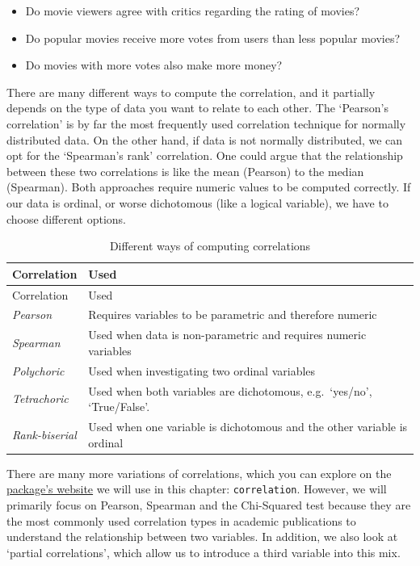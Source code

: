 \documentclass[
]{book}
\begin{document}
\begin{itemize}
\item
  Do movie viewers agree with critics regarding the rating of movies?
\item
  Do popular movies receive more votes from users than less popular movies?
\item
  Do movies with more votes also make more money?
\end{itemize}

There are many different ways to compute the correlation, and it partially depends on the type of data you want to relate to each other. The `Pearson's correlation' is by far the most frequently used correlation technique for normally distributed data. On the other hand, if data is not normally distributed, we can opt for the `Spearman's rank' correlation. One could argue that the relationship between these two correlations is like the mean (Pearson) to the median (Spearman). Both approaches require numeric values to be computed correctly. If our data is ordinal, or worse dichotomous (like a logical variable), we have to choose different options.

\begin{longtable}[]{@{}
  >{\raggedright\arraybackslash}p{}
  >{\raggedright\arraybackslash}p{}@{}}
\caption{\label{tab:different-correlations} Different ways of computing correlations}\tabularnewline
\toprule
Correlation & Used \\
\midrule
\endfirsthead
\toprule
Correlation & Used \\
\midrule
\endhead
\emph{Pearson} & Requires variables to be parametric and therefore numeric \\
\emph{Spearman} & Used when data is non-parametric and requires numeric variables \\
\emph{Polychoric} & Used when investigating two ordinal variables \\
\emph{Tetrachoric} & Used when both variables are dichotomous, e.g.~`yes/no', `True/False'. \\
\emph{Rank-biserial} & Used when one variable is dichotomous and the other variable is ordinal \\
\bottomrule
\end{longtable}

There are many more variations of correlations, which you can explore on the \href{https://easystats.github.io/correlation/articles/types.html}{package's website} we will use in this chapter: \texttt{correlation}. However, we will primarily focus on Pearson, Spearman and the Chi-Squared test because they are the most commonly used correlation types in academic publications to understand the relationship between two variables. In addition, we also look at `partial correlations', which allow us to introduce a third variable into this mix.
\end{document}
